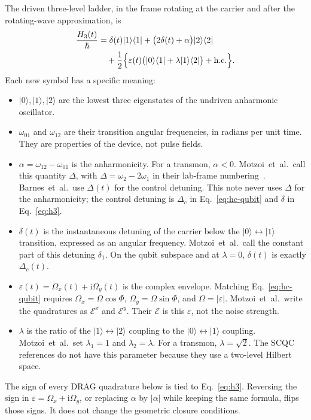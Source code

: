\documentclass[11pt,a4paper]{article}
\theoremstyle{definition}
\newcommand{\ket}[1]{\lvert #1\rangle}
\newcommand{\bra}[1]{\langle #1\rvert}
\newcommand{\abs}[1]{\lvert #1\rvert}
\newcommand{\ii}{\mathrm{i}}
\newcommand{\eps}{\varepsilon}
\begin{document}
The driven three-level ladder, in the frame rotating at the carrier and after
the rotating-wave approximation, is
\begin{equation}
\label{eq:h3}
\begin{aligned}
  \frac{H_3(t)}{\hbar}
  &=\delta(t)\ket1\bra1+\bigl(2\delta(t)+\alpha\bigr)\ket2\bra2 \\
  &\quad+\frac12\Bigl\{\eps(t)\bigl(\ket0\bra1+\lambda\ket1\bra2\bigr)
       +\text{h.c.}\Bigr\}.
\end{aligned}
\end{equation}
Each new symbol has a specific meaning:
\begin{itemize}
  \item \(\ket0,\ket1,\ket2\) are the lowest three eigenstates of the undriven
        anharmonic oscillator.
  \item \(\omega_{01}\) and \(\omega_{12}\) are their transition angular
        frequencies, in radians per unit time.  They are properties of the
        device, not pulse fields.
  \item \(\alpha=\omega_{12}-\omega_{01}\) is the anharmonicity.  For a
        transmon, \(\alpha<0\).  Motzoi~et~al.\ call this quantity \(\Delta\),
        with \(\Delta=\omega_2-2\omega_1\) in their lab-frame
        numbering~\cite{Motzoi2009}.  Barnes~et~al.\ use \(\Delta(t)\) for the
        control detuning.  This note never uses \(\Delta\) for the
        anharmonicity; the control detuning is \(\Delta_c\) in
        Eq.~\eqref{eq:hc-qubit} and \(\delta\) in Eq.~\eqref{eq:h3}.
  \item \(\delta(t)\) is the instantaneous detuning of the carrier below the
        \(\ket0\leftrightarrow\ket1\) transition, expressed as an angular
        frequency.  Motzoi~et~al.\ call the constant part of this detuning
        \(\delta_1\).  On the qubit subspace and at \(\lambda=0\),
        \(\delta(t)\) is exactly \(\Delta_c(t)\).
  \item \(\eps(t)=\Omega_x(t)+\ii\Omega_y(t)\) is the complex envelope.
        Matching Eq.~\eqref{eq:hc-qubit} requires
        \(\Omega_x=\Omega\cos\Phi\), \(\Omega_y=\Omega\sin\Phi\), and
        \(\Omega=\abs{\eps}\).  Motzoi~et~al.\ write the quadratures as
        \(\mathcal{E}^x\) and \(\mathcal{E}^y\).  Their \(\mathcal{E}\) is this
        \(\eps\), not the noise strength.
  \item \(\lambda\) is the ratio of the \(\ket1\leftrightarrow\ket2\) coupling
        to the \(\ket0\leftrightarrow\ket1\) coupling.  Motzoi~et~al.\ set
        \(\lambda_1=1\) and \(\lambda_2=\lambda\).  For a transmon,
        \(\lambda=\sqrt2\).  The SCQC references do not have this parameter
        because they use a two-level Hilbert space.
\end{itemize}
The sign of every DRAG quadrature below is tied to Eq.~\eqref{eq:h3}.
Reversing the sign in \(\eps=\Omega_x+\ii\Omega_y\), or replacing \(\alpha\) by
\(\abs\alpha\) while keeping the same formula, flips those signs.  It does not
change the geometric closure conditions.
\end{document}
